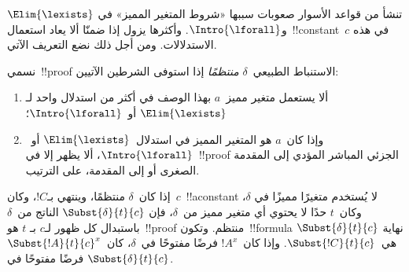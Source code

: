 \documentclass[../../../include/open-logic-section]{subfiles}
\begin{document}


تنشأ من قواعد الأسوار صعوبات سببها «شروط المتغير المميز» في
$\Elim{\lexists}$ و$\Intro{\lforall}$. وأكثرها يزول إذا ضمنّا ألا يعاد
استعمال~!!{constant}~$c$ في هذه الاستدلالات. ومن أجل ذلك نضع التعريف
الآتي.

\begin{defn}
نسمي~!!{proof} الاستنباط الطبيعي~$\delta$ \emph{منتظمًا} إذا استوفى
الشرطين الآتيين:
\begin{enumerate}
  \item ألا يستعمل متغير مميز~$a$ بهذا الوصف في أكثر من استدلال واحد
  لـ$\Elim{\lexists}$ أو~$\Intro{\lforall}$؛
  \item وإذا كان~$a$ هو المتغير المميز في استدلال~$\Elim{\lexists}$
  أو~$\Intro{\lforall}$، ألا يظهر إلا في~!!{proof} الجزئي المباشر المؤدي
  إلى المقدمة الصغرى أو إلى المقدمة، على الترتيب.
\end{enumerate}
\end{defn}

\begin{lem} إذا كان~$\delta$ منتظمًا،
وينتهي بـ$!C$، وكان~$c$~!!a{constant} لا يُستخدم متغيرًا مميزًا في
$\delta$، وكان~$t$ حدًا لا يحتوي أي متغير مميز من~$\delta$، فإن
$\Subst{\delta}{t}{c}$ الناتج من~$\delta$ باستبدال كل ظهور لـ$c$ بـ
$t$ هو~!!{proof} منتظم. وتكون~!!{formula} نهاية
$\Subst{\delta}{t}{c}$ هي~$\Subst{!C}{t}{c}$. وإذا كان~$!A^x$ فرضًا
مفتوحًا في~$\delta$، كان~$\Subst{!A}{t}{c}^x$ فرضًا مفتوحًا في
$\Subst{\delta}{t}{c}$.
\end{lem}
\end{document}
